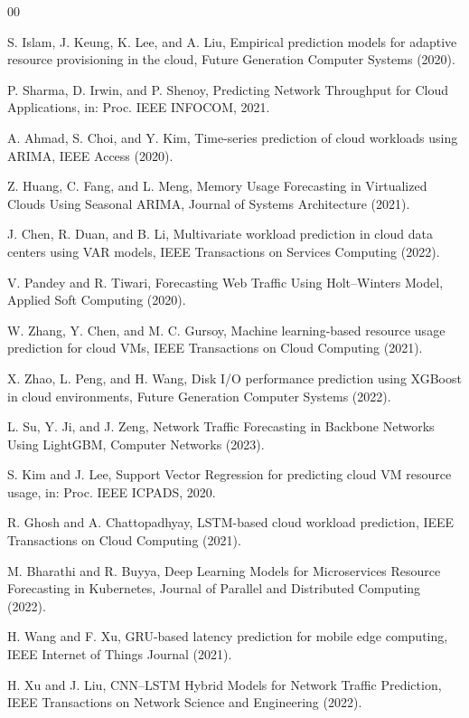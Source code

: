\documentclass[a4paper,fleqn]{cas-dc}
\begin{document}
\begin{thebibliography}{00}

S. Islam, J. Keung, K. Lee, and A. Liu,
Empirical prediction models for adaptive resource provisioning in the cloud,
Future Generation Computer Systems (2020).

P. Sharma, D. Irwin, and P. Shenoy,
Predicting Network Throughput for Cloud Applications,
in: Proc. IEEE INFOCOM, 2021.

A. Ahmad, S. Choi, and Y. Kim,
Time-series prediction of cloud workloads using ARIMA,
IEEE Access (2020).

Z. Huang, C. Fang, and L. Meng,
Memory Usage Forecasting in Virtualized Clouds Using Seasonal ARIMA,
Journal of Systems Architecture (2021).

J. Chen, R. Duan, and B. Li,
Multivariate workload prediction in cloud data centers using VAR models,
IEEE Transactions on Services Computing (2022).

V. Pandey and R. Tiwari,
Forecasting Web Traffic Using Holt--Winters Model,
Applied Soft Computing (2020).

W. Zhang, Y. Chen, and M. C. Gursoy,
Machine learning-based resource usage prediction for cloud VMs,
IEEE Transactions on Cloud Computing (2021).

X. Zhao, L. Peng, and H. Wang,
Disk I/O performance prediction using XGBoost in cloud environments,
Future Generation Computer Systems (2022).

L. Su, Y. Ji, and J. Zeng,
Network Traffic Forecasting in Backbone Networks Using LightGBM,
Computer Networks (2023).

S. Kim and J. Lee,
Support Vector Regression for predicting cloud VM resource usage,
in: Proc. IEEE ICPADS, 2020.

R. Ghosh and A. Chattopadhyay,
LSTM-based cloud workload prediction,
IEEE Transactions on Cloud Computing (2021).

M. Bharathi and R. Buyya,
Deep Learning Models for Microservices Resource Forecasting in Kubernetes,
Journal of Parallel and Distributed Computing (2022).

H. Wang and F. Xu,
GRU-based latency prediction for mobile edge computing,
IEEE Internet of Things Journal (2021).

H. Xu and J. Liu,
CNN--LSTM Hybrid Models for Network Traffic Prediction,
IEEE Transactions on Network Science and Engineering (2022).


\end{thebibliography}
\end{document}
